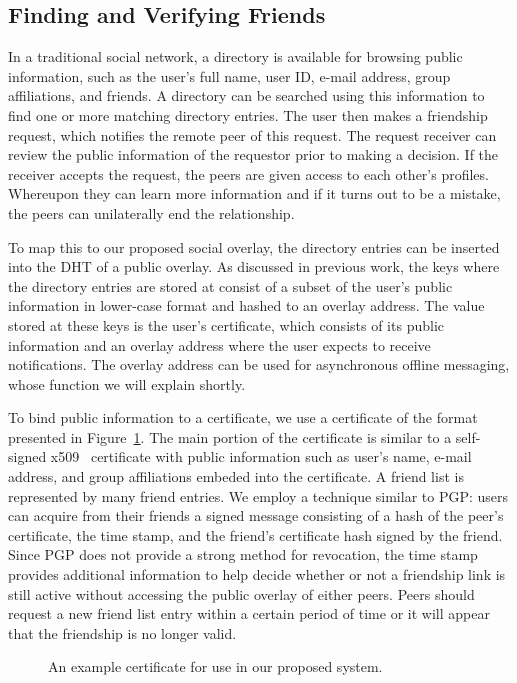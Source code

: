 \documentclass[letterpaper,twocolumn,10pt]{article}
\begin{document}
\subsection{Finding and Verifying Friends}
In a traditional social network, a directory is available for browsing public information, 
such as the user's full name, user ID,
e-mail address, group affiliations, and friends.  A directory can be searched
using this information to find one or more matching directory entries.  The user
then makes a friendship request, which notifies the remote peer of this request.
The request receiver can review the public information of the requestor prior to
making a decision.  If the receiver accepts the request, the peers are given
access to each other's profiles.  Whereupon they can learn more information
and if it turns out to be a mistake, the peers can unilaterally end the
relationship.

To map this to our proposed social overlay, the directory entries can be
inserted into the DHT of a public overlay.  As discussed in previous work, the keys where the
directory entries are stored at consist of a subset of the user's public
information in lower-case format and hashed to an overlay  address.  The value
stored at these keys is the user's certificate, which consists of its public
information and an overlay address where the user expects to receive
notifications.  The overlay address can be used for asynchronous offline
messaging, whose function we will explain shortly.

To bind public information to a certificate, we use a certificate of the format
presented in Figure~\ref{fig:certificate}.  The main portion of the certificate is 
similar to a self-signed x509~\cite{x509} certificate with public information
such as user's name, e-mail address, and group affiliations embeded
into the certificate.  A friend list is represented by many friend entries. 
We employ a technique similar to PGP: users can acquire from their friends
a signed message consisting of a hash of the peer's certificate, the time stamp,
and the friend's certificate hash signed by the friend.  Since PGP does not
provide a strong method for revocation, the time stamp provides additional information
to help decide whether or not a friendship link is still active without
accessing the public overlay of either peers.  Peers should request a new friend
list entry within a certain period of time or it will appear that the friendship
is no longer valid.

\begin{figure}[ht]
\centering
{}
\caption{An example certificate for use in our proposed system.}
\label{fig:certificate}
\end{figure}
\end{document}
